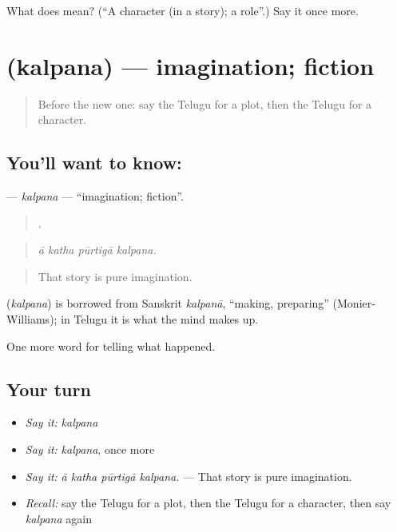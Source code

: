 \begin{tcolorbox}[breakable,colback=teal!4,colframe=teal!35!black,title={Before you move on}]
What does  mean? (\textquotedblleft{}A character (in a story); a role\textquotedblright{}.) Say it once more.
\end{tcolorbox}
\section[\texorpdfstring{\te{కల్పన} (kalpana)}{కల్పన (kalpana)}]{ (kalpana) — imagination; fiction}

\label{lesson:TE-C372-kalpana}



\begin{quote}
Before the new one: say the Telugu for a plot, then the Telugu for a character.
\end{quote}

\subsection*{You'll want to know: }
\textbf{} — \emph{kalpana} — \textquotedblleft{}imagination; fiction\textquotedblright{}.

\begin{quote}
   .
\end{quote}

\begin{quote}
\emph{ā katha pūrtigā kalpana.}
\end{quote}

\begin{quote}
That story is pure imagination.
\end{quote}

\begin{cousinweb}
\textbf{} (\emph{kalpana}) is borrowed from Sanskrit \emph{kalpanā}, \textquotedblleft{}making, preparing\textquotedblright{} (Monier-Williams); in Telugu it is what the mind makes up.
\end{cousinweb}

\begin{grammarlens}[title={What you've built}]
One more word for telling what happened.
\end{grammarlens}

\subsection*{Your turn}
\begin{itemize}
\raggedright
  \item \emph{Say it:} \emph{kalpana}
  \item \emph{Say it:} \emph{kalpana}, once more
  \item \emph{Say it:} \emph{ā katha pūrtigā kalpana.} — That story is pure imagination.
  \item \emph{Recall:} say the Telugu for a plot, then the Telugu for a character, then say \emph{kalpana} again
\end{itemize}

